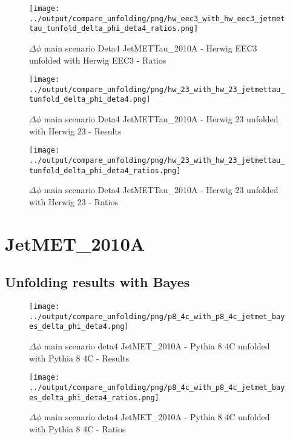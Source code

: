 \documentclass[11pt]{book}
\begin{document}
\begin{figure}[ht]
\centering
\texttt{[image: ../output/compare\_unfolding/png/hw\_eec3\_with\_hw\_eec3\_jetmettau\_tunfold\_delta\_phi\_deta4\_ratios.png]}
\caption{$\Delta\phi$ main scenario Deta4 JetMETTau\_2010A - Herwig EEC3 unfolded with Herwig EEC3 - Ratios}
\label{hw_eec3_hw_eec3_jetmettau_tunfold_delta_phi_deta4_b}
\end{figure}

\begin{figure}[ht]
\centering
\texttt{[image: ../output/compare\_unfolding/png/hw\_23\_with\_hw\_23\_jetmettau\_tunfold\_delta\_phi\_deta4.png]}
\caption{$\Delta\phi$ main scenario Deta4 JetMETTau\_2010A - Herwig 23 unfolded with Herwig 23 - Results}
\label{hw_23_hw_23_jetmettau_tunfold_delta_phi_deta4_a}
\end{figure}

\begin{figure}[ht]
\centering
\texttt{[image: ../output/compare\_unfolding/png/hw\_23\_with\_hw\_23\_jetmettau\_tunfold\_delta\_phi\_deta4\_ratios.png]}
\caption{$\Delta\phi$ main scenario Deta4 JetMETTau\_2010A - Herwig 23 unfolded with Herwig 23 - Ratios}
\label{hw_23_hw_23_jetmettau_tunfold_delta_phi_deta4_b}
\end{figure}


\clearpage
\section{JetMET\_2010A}
\subsection{Unfolding results with Bayes}

\begin{figure}[ht]
\centering
\texttt{[image: ../output/compare\_unfolding/png/p8\_4c\_with\_p8\_4c\_jetmet\_bayes\_delta\_phi\_deta4.png]}
\caption{$\Delta\phi$ main scenario deta4 JetMET\_2010A - Pythia 8 4C unfolded with Pythia 8 4C - Results}
\label{p8_p8_jetmet_bayes_delta_phi_deta4_a}
\end{figure}

\begin{figure}[ht]
\centering
\texttt{[image: ../output/compare\_unfolding/png/p8\_4c\_with\_p8\_4c\_jetmet\_bayes\_delta\_phi\_deta4\_ratios.png]}
\caption{$\Delta\phi$ main scenario deta4 JetMET\_2010A - Pythia 8 4C unfolded with Pythia 8 4C - Ratios}
\label{p8_p8_jetmet_bayes_delta_phi_deta4_b}
\end{figure}
\end{document}
